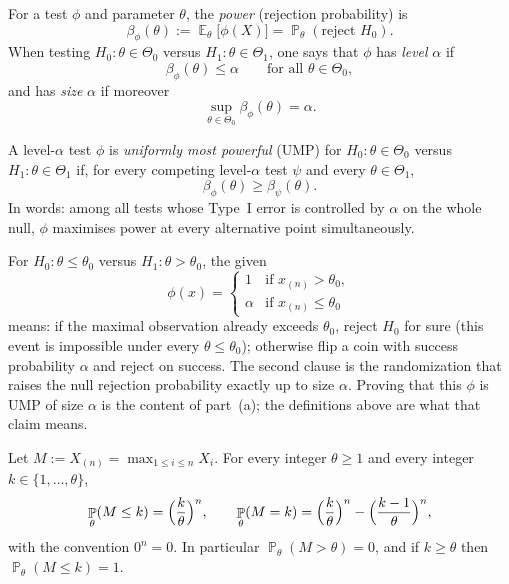 \documentclass[11pt,a4paper]{article}
\DeclareMathOperator{\E}{\mathbb{E}}
\DeclareMathOperator{\Pbb}{\mathbb{P}}
\begin{document}
\begin{definition}
\label{def:p11a-size}
For a test \(\phi\) and parameter \(\theta\), the \emph{power} (rejection probability) is
\[
\beta_\phi(\theta)
:=
\E_\theta\bigl[\phi(X)\bigr]
=
\Pbb_\theta(\text{reject }H_0).
\]
When testing \(H_0:\theta\in\Theta_0\) versus \(H_1:\theta\in\Theta_1\), one says that \(\phi\) has \emph{level} \(\alpha\) if
\[
\beta_\phi(\theta)\le\alpha
\qquad\text{for all }\theta\in\Theta_0,
\]
and has \emph{size} \(\alpha\) if moreover
\[
\sup_{\theta\in\Theta_0}\beta_\phi(\theta)=\alpha.
\]
\end{definition}

\begin{definition}
\label{def:p11a-ump}
A level-\(\alpha\) test \(\phi\) is \emph{uniformly most powerful} (UMP) for \(H_0:\theta\in\Theta_0\) versus \(H_1:\theta\in\Theta_1\) if, for every competing level-\(\alpha\) test \(\psi\) and every \(\theta\in\Theta_1\),
\[
\beta_\phi(\theta)
\ge
\beta_\psi(\theta).
\]
In words: among all tests whose Type~I error is controlled by \(\alpha\) on the whole null, \(\phi\) maximises power at every alternative point simultaneously.
\end{definition}

\begin{remark*}
For \(H_0:\theta\le\theta_0\) versus \(H_1:\theta>\theta_0\), the given
\[
\phi(x)
=
\begin{cases}
1 & \text{if }x_{(n)}>\theta_0,\\
\alpha & \text{if }x_{(n)}\le\theta_0
\end{cases}
\]
means: if the maximal observation already exceeds \(\theta_0\), reject \(H_0\) for sure (this event is impossible under every \(\theta\le\theta_0\)); otherwise flip a coin with success probability \(\alpha\) and reject on success. The second clause is the randomization that raises the null rejection probability exactly up to size \(\alpha\). Proving that this \(\phi\) is UMP of size \(\alpha\) is the content of part~(a); the definitions above are what that claim means.
\end{remark*}

\begin{lemma}
\label{lem:p11-max}
Let \(M:=X_{(n)}=\max_{1\le i\le n}X_i\). For every integer \(\theta\ge 1\) and every integer \(k\in\{1,\dots,\theta\}\),
\[
\Pbb_\theta(M\le k)
=
\Bigl(\frac{k}{\theta}\Bigr)^n,
\qquad
\Pbb_\theta(M=k)
=
\Bigl(\frac{k}{\theta}\Bigr)^n-\Bigl(\frac{k-1}{\theta}\Bigr)^n,
\]
with the convention \(0^n=0\). In particular \(\Pbb_\theta(M>\theta)=0\), and if \(k\ge\theta\) then \(\Pbb_\theta(M\le k)=1\).
\end{lemma}
\end{document}
